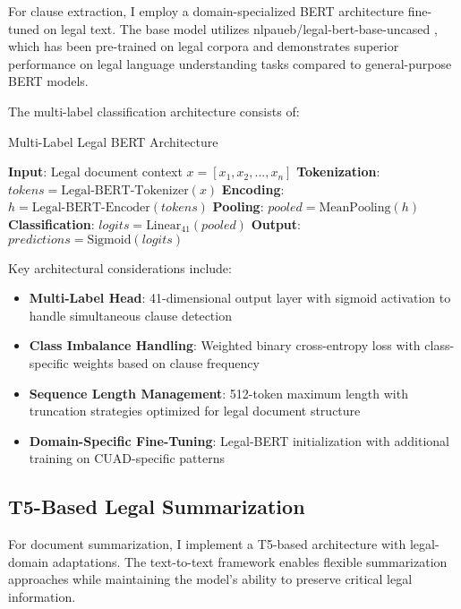 For clause extraction, I employ a domain-specialized BERT architecture fine-tuned on legal text. The base model utilizes nlpaueb/legal-bert-base-uncased \cite{chalkidis2020legal}, which has been pre-trained on legal corpora and demonstrates superior performance on legal language understanding tasks compared to general-purpose BERT models.

The multi-label classification architecture consists of:

\begin{algorithm}
\caption{Multi-Label Legal BERT Architecture}
\begin{algorithmic}
\STATE \textbf{Input}: Legal document context $x = [x_1, x_2, ..., x_n]$
\STATE \textbf{Tokenization}: $tokens = \text{Legal-BERT-Tokenizer}(x)$
\STATE \textbf{Encoding}: $h = \text{Legal-BERT-Encoder}(tokens)$
\STATE \textbf{Pooling}: $pooled = \text{MeanPooling}(h)$
\STATE \textbf{Classification}: $logits = \text{Linear}_{41}(pooled)$
\STATE \textbf{Output}: $predictions = \text{Sigmoid}(logits)$
\end{algorithmic}
\end{algorithm}

Key architectural considerations include:

\begin{itemize}
    \item \textbf{Multi-Label Head}: 41-dimensional output layer with sigmoid activation to handle simultaneous clause detection
    \item \textbf{Class Imbalance Handling}: Weighted binary cross-entropy loss with class-specific weights based on clause frequency
    \item \textbf{Sequence Length Management}: 512-token maximum length with truncation strategies optimized for legal document structure
    \item \textbf{Domain-Specific Fine-Tuning}: Legal-BERT initialization with additional training on CUAD-specific patterns
\end{itemize}

\subsection{T5-Based Legal Summarization}

For document summarization, I implement a T5-based architecture \cite{raffel2020t5} with legal-domain adaptations. The text-to-text framework enables flexible summarization approaches while maintaining the model's ability to preserve critical legal information.

